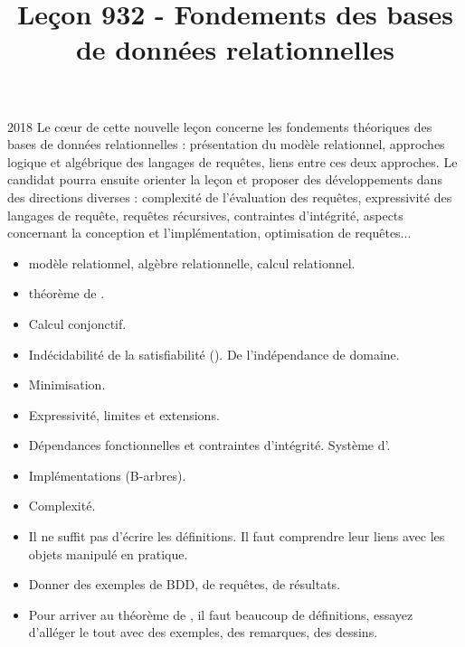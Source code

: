 \documentclass{agregfiche}
\title{Leçon 932 - Fondements des bases de données relationnelles}
\begin{document}
\maketitle

\secrapports
\begin{rapport}{2018}
    Le cœur de cette nouvelle leçon concerne les fondements
    théoriques des bases de données relationnelles :
    présentation du modèle relationnel, approches logique et
    algébrique des langages de requêtes, liens entre
    ces deux approches.
    Le candidat pourra ensuite orienter la leçon et proposer des
    développements dans des directions diverses : complexité de
    l’évaluation des requêtes, expressivité
    des langages de requête, requêtes récursives, contraintes
    d’intégrité, aspects concernant la conception
    et l’implémentation, optimisation de
    requêtes...
\end{rapport}

\secindispensables

\begin{itemize}
    \item  modèle relationnel, algèbre relationnelle, calcul
      relationnel.
    \item théorème de .
\end{itemize}

\secasavoir

\begin{itemize}
    \item Calcul conjonctif.
    \item Indécidabilité de la satisfiabilité ().
      De l'indépendance de domaine.
\end{itemize}

\secidees

\begin{itemize}
    \item Minimisation.
    \item Expressivité, limites et extensions.
    \item Dépendances fonctionnelles et contraintes d'intégrité.
	Système d'.
    \item Implémentations (B-arbres).
    \item Complexité.
\end{itemize}

\secpieges

\begin{itemize}
    \item Il ne suffit pas d'écrire les définitions. Il faut
	comprendre leur liens avec les objets manipulé en pratique.
    \item Donner des exemples de BDD, de requêtes, de résultats.
    \item Pour arriver au théorème de , il faut beaucoup de
    définitions, essayez d'alléger le tout avec des exemples, des
    remarques, des dessins.
\end{itemize}
\end{document}
